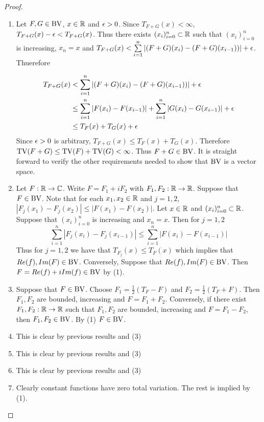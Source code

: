 \documentclass{book}
\begin{document}
	\begin{proof}
		\begin{enumerate}
			\item Let $F, G \in \text{BV}$, $x \in \mathbb{R}$ and $\epsilon>0$. Since $T_{F+G}(x) < \infty$, $T_{F+G}(x)-\epsilon< T_{F+G}(x)$. Thus there exists $(x_i)_{i=0}^n \subset \mathbb{R}$ such that $(x_i)_{i=0}^n$ is increasing, $x_n=x$ and $T_{F+G}(x) < \sum\limits_{i=1}^n |(F+G)(x_i) - (F+G)(x_{i-1}))|+ \epsilon$. Thuerefore 
			
			\begin{align*}
				T_{F+G}(x)
				& < \sum\limits_{i=1}^n |(F+G)(x_i) - (F+G)(x_{i-1}))|+ \epsilon\\
				& \leq \sum\limits_{i=1}^n |F(x_i)-F(x_{i-1})|+ \sum\limits_{i=1}^n|G(x_i)-G(x_{i-1})| + \epsilon\\
				& \leq T_F(x) + T_G(x) + \epsilon
			\end{align*}
			Since $\epsilon >0$ is arbitrary, $T_{F+G}(x) \leq T_F(x)+T_G(x)$. Therefore $\text{TV}(F+G) \leq \text{TV}(F)+\text{TV}(G)<\infty$. Thus $F+G \in \text{BV}$. It is straight forward to verify the other requirements needed to show that $\text{BV}$ is a vector space.
			
			\item Let $F: \mathbb{R} \rightarrow \mathbb{C}$. Write $F=F_1+iF_2$ with $F_1, F_2:\mathbb{R} \rightarrow \mathbb{R}$. Suppose that $F \in \text{BV}$. Note that for each $x_1,x_2 \in \mathbb{R}$ and $j =1,2$, $|F_j(x_1)-F_j(x_2)| \leq |F(x_1)-F(x_2)|$. Let $x\in \mathbb{R}$ and $(x_i)_{i=0}^n \subset \mathbb{R}$. Suppose that $(x_i)_{i=0}^n$ is increasing and $x_n=x$. Then for $j=1,2$ 
			$$\sum\limits_{i=1}^n|F_j(x_i)-F_j(x_{i-1})| \leq \sum\limits_{i=1}^n|F(x_i)-F(x_{i-1})|$$
			Thus for $j=1,2$ we have that $T_{F_j}(x) \leq T_F(x)$ which implies that $Re(f),Im(F) \in \text{BV}$. Conversely, Suppose that $Re(f), Im(F) \in \text{BV}$. Then $F=Re(f)+iIm(f) \in \text{BV}$ by (1).
			\item Suppose that $F \in \text{BV}$. Choose $F_1=\frac{1}{2}(T_F-F)$ and $F_2=\frac{1}{2}(T_F+F)$. Then $F_1,F_2$ are bounded, increasing and $F=F_1+F_2$. Conversely, if there exist $F_1,F_2:\mathbb{R} \rightarrow \mathbb{R}$ such that $F_1,F_2$ are bounded, increasing and $F=F_1-F_2$, then $F_1, F_2 \in \text{BV}$. By (1) $F \in \text{BV}$.
			\item This is clear by previous results and (3)
			\item This is clear by previous results and (3)
			\item This is clear by previous results and (3)
			\item Clearly constant functions have zero total variation. The rest is implied by (1).
		\end{enumerate}
	\end{proof}
	
\end{document}
